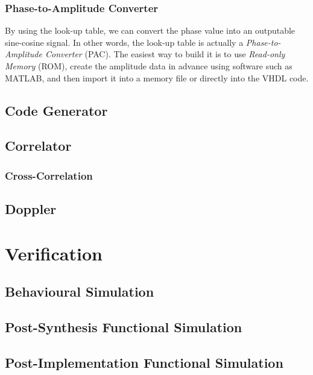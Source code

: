\subsubsection{Phase-to-Amplitude Converter}
By using the look-up table, we can convert the phase value into an outputable sine-cosine signal. In other words, the look-up table is actually a \textit{Phase-to-Amplitude Converter} (PAC). The easiest way to build it is to use \textit{Read-only Memory} (ROM)\cite{RN190}, create the amplitude data in advance using software such as MATLAB, and then import it into a memory file or directly into the VHDL code.

\subsection{Code Generator}



\subsection{Correlator}
\subsubsection{Cross-Correlation}

\subsection{Doppler}

\section{Verification}
\subsection{Behavioural Simulation}
\subsection{Post-Synthesis Functional Simulation}
\subsection{Post-Implementation Functional Simulation}
